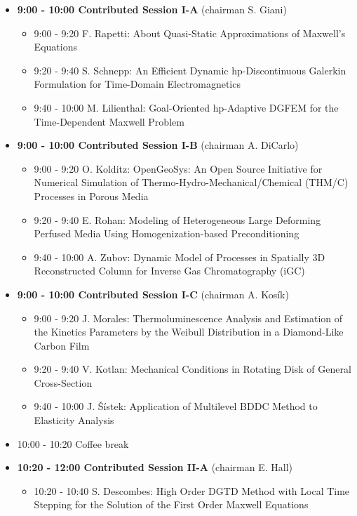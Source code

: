 \documentclass[10pt, A4]{article}%
\begin{document}
\begin{itemize}    
  \item {\bf 9:00 - 10:00 Contributed Session I-A} (chairman S. Giani) 
  \begin{itemize}
    \item 9:00 - 9:20 F. Rapetti: About Quasi-Static Approximations of Maxwell’s Equations
    \item 9:20 - 9:40 S. Schnepp: An Efficient Dynamic hp-Discontinuous Galerkin Formulation for Time-Domain Electromagnetics
    \item 9:40 - 10:00 M. Lilienthal: Goal-Oriented hp-Adaptive DGFEM for the Time-Dependent Maxwell Problem
  \end{itemize}
  \item {\bf 9:00 - 10:00 Contributed Session I-B} (chairman A. DiCarlo) 
  \begin{itemize}
    \item 9:00 - 9:20 O. Kolditz: OpenGeoSys: An Open Source Initiative for Numerical Simulation of Thermo-Hydro-Mechanical/Chemical (THM/C) Processes in Porous Media
    \item 9:20 - 9:40 E. Rohan: Modeling of Heterogeneous Large Deforming Perfused Media Using Homogenization-based Preconditioning
    \item 9:40 - 10:00 A. Zubov: Dynamic Model of Processes in Spatially 3D Reconstructed Column for Inverse Gas Chromatography (iGC)
  \end{itemize}
    \item {\bf 9:00 - 10:00 Contributed Session I-C} (chairman A. Kos\'{i}k) 
  \begin{itemize}
    \item 9:00 - 9:20 J. Morales: Thermoluminescence Analysis and Estimation of the Kinetics Parameters by the Weibull Distribution in a Diamond-Like Carbon Film
    \item 9:20 - 9:40 V. Kotlan: Mechanical Conditions in Rotating Disk of General Cross-Section
    \item 9:40 - 10:00 J. \v{S}\'{i}stek: Application of Multilevel BDDC Method to Elasticity Analysis  
  \end{itemize}
  \item 10:00 - 10:20 Coffee break
  \item {\bf 10:20 - 12:00 Contributed Session II-A} (chairman E. Hall) 
  \begin{itemize}
    \item 10:20 - 10:40 S. Descombes: High Order DGTD Method with Local Time Stepping for the Solution of the First Order Maxwell Equations

\end{itemize}
\end{itemize}
\end{document}
